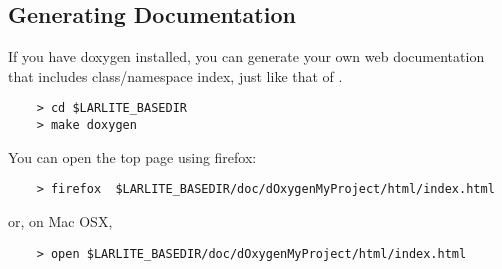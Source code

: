 \subsection{Generating Documentation}
\label{sec:gendoxygen}
If you have {\ttfamily doxygen} installed, you can generate your own web documentation that includes \CPP class/namespace index, just like that of \ROOT.
\begin{lstlisting}
    > cd $LARLITE_BASEDIR
    > make doxygen
\end{lstlisting}
You can open the top page using firefox:
\begin{lstlisting}
    > firefox  $LARLITE_BASEDIR/doc/dOxygenMyProject/html/index.html
\end{lstlisting}
or, on Mac OSX,
\begin{lstlisting}
    > open $LARLITE_BASEDIR/doc/dOxygenMyProject/html/index.html
\end{lstlisting}

